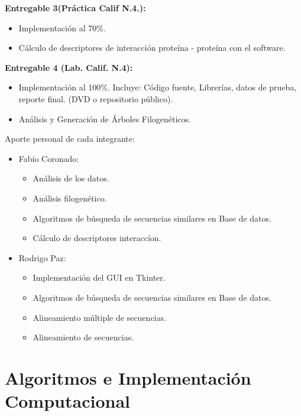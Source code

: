 \documentclass[twocolumn,twoside,11pt]{article}
\begin{document}
\textbf{Entregable 3(Práctica Calif N.4.):}
\begin{itemize}
\item Implementaci\'on al 70\%.
\item C\'alculo de descriptores de interacci\'on prote\'ina - prote\'ina con el software.\\

\end{itemize}

\textbf{Entregable 4 (Lab. Calif. N.4):}
\begin{itemize}
\item Implementaci\'on al 100\%. Incluye: C\'odigo fuente, Librer\'ias, datos de
prueba, reporte final. (DVD o repositorio p\'ublico).
\item An\'alisis y Generaci\'on de \'Arboles Filogen\'eticos.\\


\end{itemize}

Aporte personal de cada integrante:\\
\begin{itemize}
\item Fabio Coronado:
      \begin{itemize}
      \item An\'alisis de los datos.
       \item An\'alisis filogen\'etico.
       \item Algoritmos de b\'usqueda de secuencias similares en Base de datos.
       \item C\'alculo de descriptores interacc\'ion.
      \end{itemize}
\item Rodrigo Paz:
      \begin{itemize}
      \item Implementaci\'on del GUI en Tkinter.
      \item Algoritmos de b\'usqueda de secuencias similares en Base de datos.
      \item Alineamiento m\'ultiple de secuencias.
      \item Alineamiento de secuencias. 
      \end{itemize}

\end{itemize}



\section{Algoritmos e Implementaci\'on Computacional}
\end{document}
